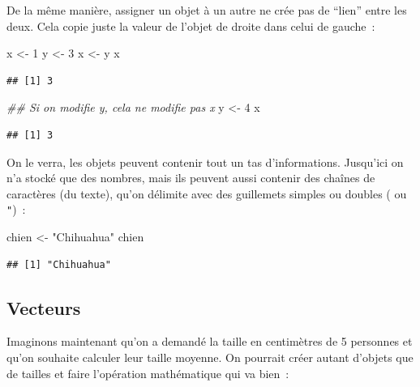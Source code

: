 \documentclass[12pt,]{book}
\newenvironment{Shaded}{\begin{snugshade}}{\end{snugshade}}
\newcommand{\CommentTok}[1]{\textcolor[rgb]{0.56,0.35,0.01}{\textit{#1}}}
\newcommand{\DecValTok}[1]{\textcolor[rgb]{0.00,0.00,0.81}{#1}}
\newcommand{\NormalTok}[1]{#1}
\newcommand{\StringTok}[1]{\textcolor[rgb]{0.31,0.60,0.02}{#1}}
\begin{document}
De la même manière, assigner un objet à un autre ne crée pas de ``lien'' entre les deux. Cela copie juste la valeur de l'objet de droite dans celui de gauche~:

\begin{Shaded}
\begin{Highlighting}[]
\NormalTok{x <-}\StringTok{ }\DecValTok{1}
\NormalTok{y <-}\StringTok{ }\DecValTok{3}
\NormalTok{x <-}\StringTok{ }\NormalTok{y}
\NormalTok{x}
\end{Highlighting}
\end{Shaded}

\begin{verbatim}
## [1] 3
\end{verbatim}

\begin{Shaded}
\begin{Highlighting}[]
\CommentTok{## Si on modifie y, cela ne modifie pas x}
\NormalTok{y <-}\StringTok{ }\DecValTok{4}
\NormalTok{x}
\end{Highlighting}
\end{Shaded}

\begin{verbatim}
## [1] 3
\end{verbatim}

On le verra, les objets peuvent contenir tout un tas d'informations. Jusqu'ici on n'a stocké que des nombres, mais ils peuvent aussi contenir des chaînes de caractères (du texte), qu'on délimite avec des guillemets simples ou doubles (\texttt{\textquotesingle{}} ou \texttt{"})~:

\begin{Shaded}
\begin{Highlighting}[]
\NormalTok{chien <-}\StringTok{ "Chihuahua"}
\NormalTok{chien}
\end{Highlighting}
\end{Shaded}

\begin{verbatim}
## [1] "Chihuahua"
\end{verbatim}

\hypertarget{vecteurs}{%
\subsection{Vecteurs}\label{vecteurs}}

Imaginons maintenant qu'on a demandé la taille en centimètres de 5 personnes et qu'on souhaite calculer leur taille moyenne. On pourrait créer autant d'objets que de tailles et faire l'opération mathématique qui va bien~:
\end{document}
